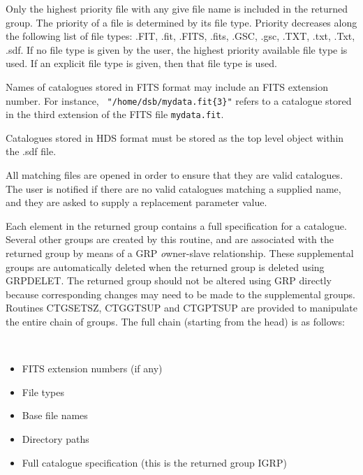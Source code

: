 \documentclass[twoside,11pt]{article}
\newcommand{\htmlref}[2]{#1}
\renewcommand{\_}{\texttt{\symbol{95}}}
\newcommand{\sstitemlist}[1]{
  \mbox{} \\
  \vspace{-3.5ex}
  \begin{itemize}
     #1
  \end{itemize}
}
\newcommand{\sstitem}{\item}
\newcommand{\sstitemlist}[1]{
      \begin{itemize}
         #1
      \end{itemize}
      \\
   }
\newcommand{\sstitem}{\item}
\begin{document}
{{{         \sstitem
         Only the highest priority file with any give file name is included
         in the returned group. The priority of a file is determined by its
         file type. Priority decreases along the following list of file
         types: .FIT, .fit, .FITS, .fits, .GSC, .gsc, .TXT, .txt, .Txt, .sdf.
         If no file type is given by the user, the highest priority available
         file type is used. If an explicit file type is given, then that file
         type is used.

         \sstitem
         Names of catalogues stored in FITS format may include an FITS
	 extension number. For instance, {\tt
	 "/home/dsb/mydata.fit\{3\}"} refers to a catalogue stored in
	 the third extension of the FITS file {\tt mydata.fit}.

         \sstitem
         Catalogues stored in HDS format must be stored as the top level
         object within the .sdf file.

         \sstitem
         All matching files are opened in order to ensure that they are
         valid catalogues. The user is notified if there are no valid
         catalogues matching a supplied name, and they are asked to supply a
         replacement parameter value.

         \sstitem
         Each element in the returned group contains a full specification
         for a catalogue. Several other groups are created by this routine,
         and are associated with the returned group by means of a GRP
         {\emph owner-slave} relationship. These supplemental groups are
         automatically deleted when the returned group is deleted using
         GRP\_DELET. The returned group should not be altered using GRP
         directly because corresponding changes may need to be made to the
         supplemental groups. Routines \htmlref{CTG\_SETSZ}{CTG_SETSZ}, 
         \htmlref{CTG\_GTSUP}{CTG_GTSUP} and \htmlref{CTG\_PTSUP}{CTG_PTSUP}
         are provided to manipulate the entire chain of groups. The full
         chain (starting from the head) is as follows:

         \sstitemlist{
           \sstitem
               FITS extension numbers (if any)

            \sstitem
               File types

            \sstitem
               Base file names

            \sstitem
               Directory paths

            \sstitem
               Full catalogue specification (this is the returned group IGRP)
         }

}}}
\end{document}
